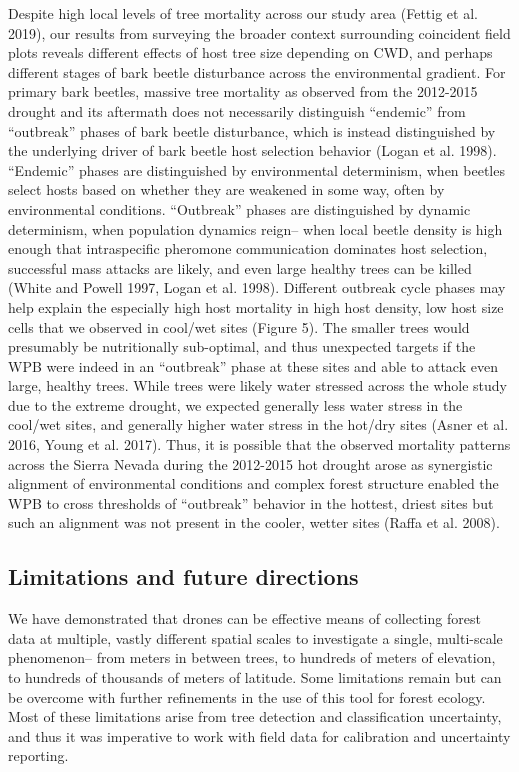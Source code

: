 \documentclass[]{article}
\begin{document}
Despite high local levels of tree mortality across our study area
(Fettig et al. 2019), our results from surveying the broader context
surrounding coincident field plots reveals different effects of host
tree size depending on CWD, and perhaps different stages of bark beetle
disturbance across the environmental gradient. For primary bark beetles,
massive tree mortality as observed from the 2012-2015 drought and its
aftermath does not necessarily distinguish ``endemic'' from ``outbreak''
phases of bark beetle disturbance, which is instead distinguished by the
underlying driver of bark beetle host selection behavior (Logan et al.
1998). ``Endemic'' phases are distinguished by environmental
determinism, when beetles select hosts based on whether they are
weakened in some way, often by environmental conditions. ``Outbreak''
phases are distinguished by dynamic determinism, when population
dynamics reign-- when local beetle density is high enough that
intraspecific pheromone communication dominates host selection,
successful mass attacks are likely, and even large healthy trees can be
killed (White and Powell 1997, Logan et al. 1998). Different outbreak
cycle phases may help explain the especially high host mortality in high
host density, low host size cells that we observed in cool/wet sites
(Figure 5). The smaller trees would presumably be nutritionally
sub-optimal, and thus unexpected targets if the WPB were indeed in an
``outbreak'' phase at these sites and able to attack even large, healthy
trees. While trees were likely water stressed across the whole study due
to the extreme drought, we expected generally less water stress in the
cool/wet sites, and generally higher water stress in the hot/dry sites
(Asner et al. 2016, Young et al. 2017). Thus, it is possible that the
observed mortality patterns across the Sierra Nevada during the
2012-2015 hot drought arose as synergistic alignment of environmental
conditions and complex forest structure enabled the WPB to cross
thresholds of ``outbreak'' behavior in the hottest, driest sites but
such an alignment was not present in the cooler, wetter sites (Raffa et
al. 2008).

\hypertarget{limitations-and-future-directions}{%
\subsection{Limitations and future
directions}\label{limitations-and-future-directions}}

We have demonstrated that drones can be effective means of collecting
forest data at multiple, vastly different spatial scales to investigate
a single, multi-scale phenomenon-- from meters in between trees, to
hundreds of meters of elevation, to hundreds of thousands of meters of
latitude. Some limitations remain but can be overcome with further
refinements in the use of this tool for forest ecology. Most of these
limitations arise from tree detection and classification uncertainty,
and thus it was imperative to work with field data for calibration and
uncertainty reporting.
\end{document}
